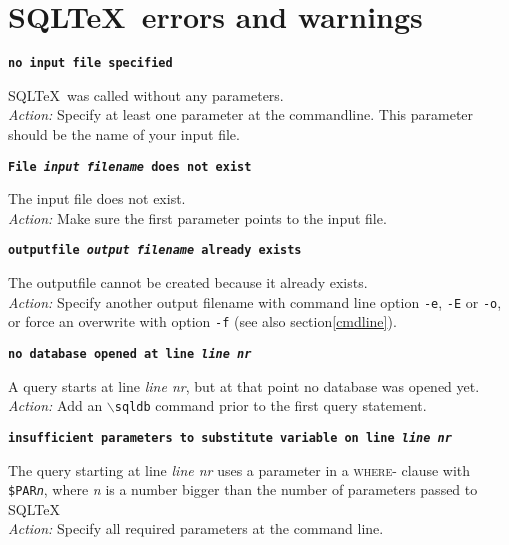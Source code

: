 \documentclass{article}
\newcommand{\bs}{\begin{math}\backslash\end{math}}
\newcommand{\vs}{\vspace{3mm}}
\begin{document}
\section{SQL\TeX\ errors and warnings}

\noindent\textbf{\texttt{no input file specified}}

\vspace{1mm}

\noindent SQL\TeX\ was called without any parameters.\\
\textit{Action:} Specify at least one parameter at the commandline. This parameter should be
the name of your input file.

\vs

\noindent\textbf{\texttt{File \textit{input filename} does not exist}}

\vspace{1mm}

\noindent The input file does not exist.\\
\textit{Action:} Make sure the first parameter points to the input file.

\vs

\noindent\textbf{\texttt{outputfile \textit{output filename} already exists}}

\vspace{1mm}

\noindent The outputfile cannot be created because it already exists.\\
\textit{Action:} Specify another output filename with command line option \texttt{-e},
\texttt{-E} or \texttt{-o}, or force an overwrite with option \texttt{-f} (see also section\ref{cmdline}).

\vs

\noindent\textbf{\texttt{no database opened at line \textit{line nr}}}

\vspace{1mm}

\noindent A query starts at line \textit{line nr}, but at that point no database was opened yet. \\
\textit{Action:} Add an \texttt{\bs sqldb} command prior to the first query statement.

\vs

\noindent\textbf{\texttt{insufficient parameters to substitute variable on line \textit{line nr}}}

\vspace{1mm}

\noindent The query starting at line \textit{line nr} uses a parameter in a \textsc{where}- clause with
\texttt{\$PAR\textit{n}}, where \textit{n} is a number bigger than the number of parameters
passed to SQL\TeX\. \\
\textit{Action:} Specify all required parameters at the command line.
\end{document}
